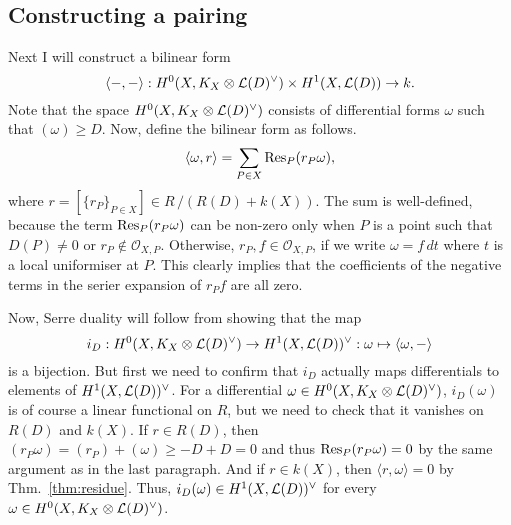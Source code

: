 \subsection{Constructing a pairing}
Next I will construct a bilinear form
\[
  \langle -,-\rangle:H^0(X,K_X\otimes\mathcal{L}(D)^{\vee})\times H^{1}(X,\mathcal{L}(D))\to k.
\]
Note that the space $H^0(X,K_X\otimes\mathcal{L}(D)^{\vee})$ consists of differential forms $\omega$
such that $(\omega)\geq D$.
Now, define the bilinear form as follows.
\[
  \langle\omega,r\rangle=\sum_{P\in X}\operatorname{Res}_{P}(r_{P}\omega),
\]
where $r=[\{r_{P}\}_{P\in X}]\in R\,/\left(R(D)+k(X)\right)$. The sum is
well-defined, because the term $\operatorname{Res}_{P}(r_{P}\omega)$ can be non-zero only
when $P$ is a point such that $D(P)\neq 0$ or $r_{P}\not\in\mathscr{O}_{X,P}$.
Otherwise, $r_{P},f\in\mathscr{O}_{X,P}$, if we write $\omega=f\,dt$
where $t$ is a local uniformiser at $P$. This clearly implies that the
coefficients of the negative terms in the serier expansion of $r_{P}f$
are all zero.

Now, Serre duality will follow from showing that the map
\[
  i_{D}:H^0(X,K_X\otimes\mathcal{L}(D)^{\vee})\to H^1(X,\mathcal{L}(D))^{\vee}
  :\omega\mapsto\langle\omega,-\rangle
\]
is a bijection. But first we need to confirm that $i_{D}$ actually maps
differentials to elements of $H^1(X,\mathcal{L}(D))^{\vee}$. For a
differential $\omega\in H^0(X,K_X\otimes\mathcal{L}(D)^{\vee})$, $i_{D}(\omega)$ is of course a linear
functional on $R$, but we need to check that it vanishes on $R(D)$ and
$k(X)$. If $r\in R(D)$, then $(r_{P}\omega)=(r_{P})+(\omega)\geq -D+D=0$
and thus $\operatorname{Res}_{P}(r_{P}\omega)=0$ by the same argument as in the last
paragraph. And if $r\in k(X)$, then $\langle r,\omega\rangle=0$ by
Thm.~\ref{thm:residue}. Thus, $i_{D}(\omega)\in H^1(X,\mathcal{L}(D))^{\vee}$
for every $\omega\in H^0(X,K_X\otimes\mathcal{L}(D)^{\vee})$.

